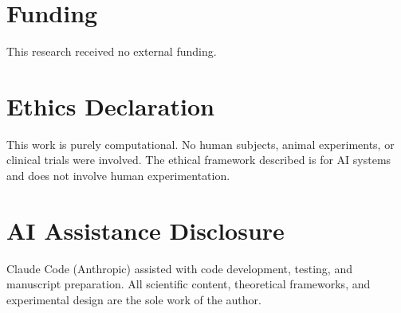 \documentclass[11pt,letterpaper]{article}
\begin{document}
\section*{Funding}
This research received no external funding.

\section*{Ethics Declaration}
This work is purely computational. No human subjects, animal experiments, or clinical trials were involved. The ethical framework described is for AI systems and does not involve human experimentation.

\section*{AI Assistance Disclosure}
Claude Code (Anthropic) assisted with code development, testing, and manuscript preparation. All scientific content, theoretical frameworks, and experimental design are the sole work of the author.



\end{document}
